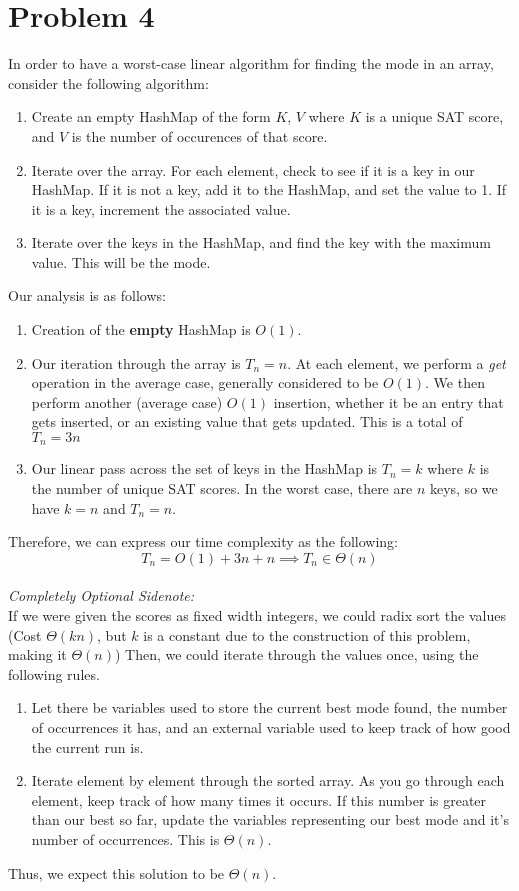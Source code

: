 \section*{Problem 4}
In order to have a worst-case linear algorithm for finding the mode in an array, consider the following algorithm:
\begin{enumerate}
    \item Create an empty HashMap of the form $K$, $V$ where $K$ is a 
    unique SAT score, and $V$ is the number of occurences of that score.
    \item Iterate over the array. For each element, check to see if it
          is a key in our HashMap.
        \subitem If it is not a key, add it to the HashMap, and set the
                 value to 1.
        \subitem If it is a key, increment the associated value.
    \item Iterate over the keys in the HashMap, and find the key with
          the maximum value. This will be the mode. 
\end{enumerate}

Our analysis is as follows:\\
\begin{enumerate}
    \item Creation of the \textbf{empty} HashMap is $O(1)$.
    \item Our iteration through the array is $T_n = n$. At each element,
          we perform a \textit{get} operation in the average case, generally considered to be $O(1)$. We then perform another (average case) $O(1)$ insertion, whether it be an entry that gets 
          inserted, or an existing value that gets updated. This is a 
          total of $T_n = 3n$
    \item Our linear pass across the set of keys in the HashMap is
          $T_n = k$ where $k$ is the number of unique SAT scores. In 
          the worst case, there are $n$ keys, so we have $k = n$ 
          and $T_n = n$.
\end{enumerate}
Therefore, we can express our time complexity as the following:
\\
$$
    T_n = O(1) + 3n + n \implies T_n \in \Theta(n)
$$
\\
\textit{Completely Optional Sidenote:}\\
If we were given the scores as fixed width integers, we could radix sort the values (Cost $\Theta(kn)$, but $k$ is a constant due to the construction of this problem, making it $\Theta(n)$) Then, we could iterate through the values once, using the following rules.
\begin{enumerate}
    \item Let there be variables used to store the current best mode found, the number of occurrences it has, and an external variable used to keep track of how good the current run is.
    \item Iterate element by element through the sorted array. As you go through each element, keep track of how many times it occurs. If this number is greater than our best so far, update the variables representing our best mode and it's number of occurrences. This is $\Theta(n)$.
\end{enumerate}
Thus, we expect this solution to be $\Theta(n)$.